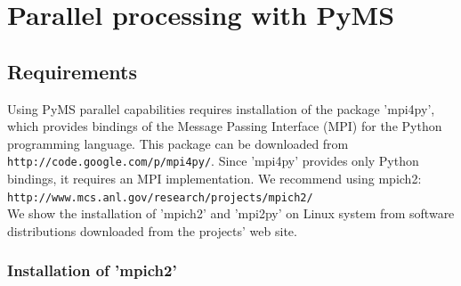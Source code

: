 

\chapter{Parallel processing with PyMS}

\section{\label{sec:mpi}Requirements}

Using PyMS parallel capabilities requires installation of the package
'mpi4py', which provides bindings of the Message Passing Interface (MPI)
for the Python programming language. This package can be downloaded
from {\tt http://code.google.com/p/mpi4py/}. Since 'mpi4py' provides
only Python bindings, it requires an MPI implementation. We recommend
using mpich2:\\
{\tt http://www.mcs.anl.gov/research/projects/mpich2/}\\
We show the installation of 'mpich2' and 'mpi2py' on Linux system from
software distributions downloaded from the projects' web site.

\subsection{\label{sec:mpich2}Installation of 'mpich2'}

